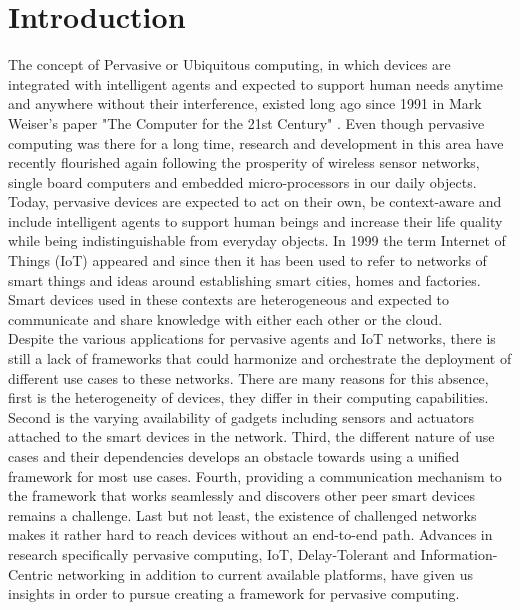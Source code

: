 
\chapter{Introduction}\label{chapter:introduction}
 The concept of Pervasive or Ubiquitous computing, in which devices are integrated with intelligent agents and expected to support human needs anytime and anywhere without their interference, existed long ago since 1991 in Mark Weiser's paper "The Computer for the 21st Century" \cite{weiser1991ubicomp}. Even though pervasive computing  was there for a long time, research and development in this area have recently flourished again following the  prosperity of wireless sensor networks, single board computers and embedded micro-processors in our daily objects. Today, pervasive devices are expected to act on their own, be context-aware and include intelligent agents to support human beings and increase their life quality while being indistinguishable from  everyday objects. In 1999 the term Internet of Things (IoT) appeared and since then it has been used to refer to networks of smart things and  ideas around establishing smart cities, homes and factories. Smart devices used in these contexts are heterogeneous and  expected to communicate and share knowledge with either each other or  the cloud.\\
 
 \noindent Despite the various applications for pervasive agents and IoT networks, there is still a lack of frameworks that could harmonize and orchestrate the deployment of different use cases to these networks. There are many reasons for this absence, first is the heterogeneity of devices, they differ in their computing capabilities. Second is the varying  availability of gadgets including sensors and actuators attached to the smart devices in the network. Third, the different nature of use cases and their dependencies develops an obstacle towards using a unified framework for most use cases. Fourth, providing a communication mechanism to the framework that works seamlessly and discovers other peer smart devices remains a challenge. Last but not least, the existence of challenged networks makes it rather hard to reach devices without an end-to-end path. Advances in research specifically  pervasive computing, IoT, Delay-Tolerant and Information-Centric networking in addition to current available platforms, have given us insights in order to pursue creating a framework for pervasive computing.\\
 
